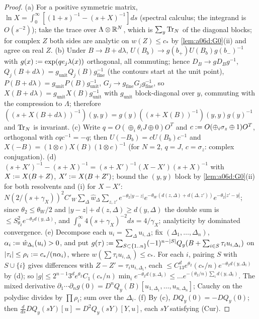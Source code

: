 \begin{proof}
(a) For a positive symmetric matrix, $\ln X=\int_0^\infty[(1+s)^{-1}-(s+X)^{-1}]ds$ (spectral calculus; the integrand is $O(s^{-2})$); take the trace over $\Lambda\otimes\mathbb R^N$, which is $\sum_y\operatorname{Tr}_N$ of the diagonal blocks; for complex $Z$ both sides are analytic on $w(Z)\le c_*$ by \cref{lem:a06d:G0}(ii) and agree on real $Z$. (b) Under $B\to B+d\lambda$, $U(B_b)\to g(b_+)U(B_b)g(b_-)^{-1}$ with $g(x):=\exp(qe_j\lambda(x))$ orthogonal, all commuting; hence $D_B\to gD_Bg^{-1}$, $Q_j(B+d\lambda)=g_{\mathrm{unit}}Q_j(B)g^{-1}_{\mathrm{fine}}$ (the contours start at the unit point), $P(B+d\lambda)=g_{\mathrm{unit}}P(B)g^{-1}_{\mathrm{unit}}$, $G_j\to g_{\mathrm{fine}}G_jg^{-1}_{\mathrm{fine}}$, so $X(B+d\lambda)=g_{\mathrm{unit}}X(B)g^{-1}_{\mathrm{unit}}$ with $g_{\mathrm{unit}}$ block-diagonal over $y$, commuting with the compression to $\Lambda$; therefore $((s+X(B+d\lambda))^{-1})(y,y)=g(y)((s+X(B))^{-1})(y,y)g(y)^{-1}$ and $\operatorname{Tr}_N$ is invariant. (c) Write $q=O(\oplus_i\theta_iJ\oplus0)O^T$ and $c:= O(\oplus_i\sigma_z\oplus1)O^T$, orthogonal with $cqc^{-1}=-q$; then $U(-B_b)=cU(B_b)c^{-1}$ and $X(-B)=(1\otimes c)X(B)(1\otimes c)^{-1}$ (for $N=2$, $q=J$, $c=\sigma_z$: complex conjugation). (d) $(s+X')^{-1}-(s+X)^{-1}=(s+X')^{-1}(X-X')(s+X)^{-1}$ with $X:= X(B+Z)$, $X':= X(B+Z')$; bound the $(y,y)$ block by \cref{lem:a06d:G0}(ii) for both resolvents and (i) for $X-X'$: $N(2/(s+\gamma_X))^2C'_W\sum_\Delta\hat w_\Delta\sum_{z,z'}e^{-\theta_2|y-z|}e^{-\theta_W(d(z,\Delta)+d(\Delta,z'))}e^{-\theta_2|z'-y|}$; since $\theta_2\le\theta_W/2$ and $|y-z|+d(z,\Delta)\ge d(y,\Delta)$ the double sum is $\le S^2_{\theta_2}e^{-\theta_2d(y,\Delta)}$, and $\int_0^\infty4(s+\gamma_X)^{-2}ds=4/\gamma_X$; analyticity by dominated convergence. (e) Decompose each $u_i=\sum_\Delta u_{i,\Delta}$; fix $(\Delta_1,\dots,\Delta_n)$, $\alpha_i:=\hat w_{\Delta_i}(u_i)>0$, and put $g(\tau):=\sum_{S\subset\{1..n\}}(-1)^{n-|S|}Q_y(B+\sum_{i\in S}\tau_iu_{i,\Delta_i})$ on $|\tau_i|\le\rho_i:= c_*/(n\alpha_i)$, where $w(\sum\tau_iu_{i,\Delta_i})\le c_*$. For each $i$, pairing $S$ with $S\cup\{i\}$ gives differences with $Z-Z'=\tau_iu_{i,\Delta_i}$, each $\le C_13^de^{\theta_2}(c_*/n)e^{-\theta_2d(y,\Delta_i)}$ by (d); so $|g|\le2^{n-1}3^de^{\theta_2}C_1(c_*/n)\min_ie^{-\theta_2d(y,\Delta_i)}\le\dots e^{-(\theta_2/n)\sum_id(y,\Delta_i)}$. The mixed derivative $\partial_1\cdots\partial_ng(0)=D^nQ_y(B)[u_{1,\Delta_1},\dots,u_{n,\Delta_n}]$; Cauchy on the polydisc divides by $\prod\rho_i$; sum over the $\Delta_i$. (f) By (c), $DQ_y(0)=-DQ_y(0)$; then $\frac d{ds}DQ_y(sY)[u]=D^2Q_y(sY)[Y,u]$, each $sY$ satisfying (Cur).
\end{proof}

